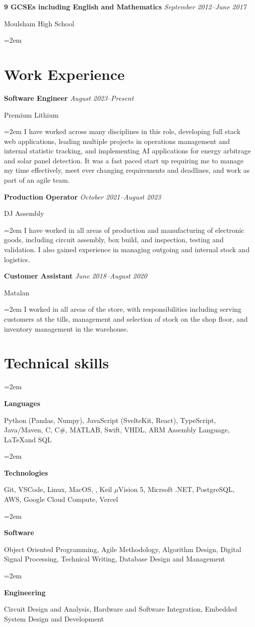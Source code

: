 \documentclass[12pt]{article} %
\newlength{\spacebox}
\newcommand{\skill}[2]{
  \noindent\hangindent=2em\hangafter=0
  \parbox{1.8\spacebox}{%
  \textbf{#1}} %
  {\small #2} \par} %
\newcommand{\education}[4]{
\noindent  \textbf{#1}
  \newline
  \noindent \textit{#2} \par
  \noindent #3 \par
\vspace*{0.5em}
  \noindent\hangindent=2em\hangafter=0 \small #4
\normalsize \par}
\newcommand{\work}[4]{
  \noindent  \textbf{#1}
  \newline
  \noindent \textit{#2} \par
  \noindent #3 \par
\vspace*{0.5em}
  \noindent\hangindent=2em\hangafter=0 \small #4 
\normalsize \par}
\begin{document}
\education{9 GCSEs including English and Mathematics}{September 2012--June 2017}{Moulsham High School}{}

\section*{Work Experience}
\work{Software Engineer}{August 2023--Present}{Premium Lithium}{I have worked across many disciplines in this role, developing full stack web applications, leading multiple projects in operations management and internal statistic tracking, and implementing AI applications for energy arbitrage and solar panel detection. It was a fast paced start up requiring me to manage my time effectively, meet ever changing requirements and deadlines, and work as part of an agile team.}
\newpage
\work{Production Operator}{October 2021--August 2023}{DJ Assembly}{I have worked in all areas of production and manufacturing of electronic goods, including circuit assembly, box build, and inspection, testing and validation. I also gained experience in managing outgoing and internal stock and logistics.}
\work{Customer Assistant}{June 2018--August 2020}{Matalan}{I worked in all areas of the store, with responsibilities including serving customers at the tills, management and selection of stock on the shop floor, and inventory management in the warehouse.}

\section*{Technical skills}

\skill{Languages}{Python (Pandas, Numpy), JavaScript (SvelteKit, React), TypeScript, Java/Maven, C, C$\#$, MATLAB, Swift, VHDL, ARM Assembly Language, \LaTeX and SQL}
\skill{Technologies}{Git, VSCode, Linux, MacOS, , Keil $\mu$Vision 5, Micrsoft .NET, PostgreSQL, AWS, Google Cloud Compute, Vercel}
\skill{Software}{Object Oriented Programming, Agile Methodology, Algorithm Design, Digital Signal Processing, Technical Writing, Database Design and Management}
\skill{Engineering}{Circuit Design and Analysis, Hardware and Software Integration, Embedded System Design and Development}
\end{document}
